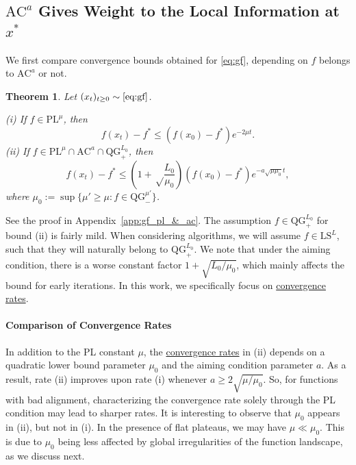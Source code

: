 \documentclass{article}
\def\xcont{(x_t)_{t\ge 0}}
\def\pl{{\text{PL}^\mu}}
\newcommand{\bpar}[1]{\left(#1\right)}
\newcommand{\ls}{\text{LS}^{L}}
\newcommand{\ac}{\text{AC}^{a}}
\newcommand{\qg}{\text{QG}_{+}^{L_0}}
\newcommand{\qginff}[1]{\text{QG}_{-}^{#1}}
\theoremstyle{plain}
\newtheorem{theorem}{Theorem}[section]
\theoremstyle{definition}
\theoremstyle{remark}
\begin{document}
\subsection{$\ac$ Gives Weight to the Local Information at $x^\ast$}\label{sec:local_weight}
We first compare convergence bounds obtained for \eqref{eq:gf}, depending on $f$ belongs to $\ac$ or not.
\begin{theorem}\label{thm:gf_pl_&_ac}
    Let $\xcont \sim \eqref{eq:gf}$. 

    \noindent
    (i) \cite[Theorem 3]{polyak2017lyapunov}  If $f \in \pl$,  then
    $$ f(x_t)-f^\ast \le (f(x_0)-f^\ast)e^{-2 \mu t}. $$
    (ii) If $f \in \pl \cap \ac \cap \qg$, then
    $$ f(x_t)-f^\ast \le \bpar{1+\sqrt\frac{L_0}{\mu_0}}(f(x_0)-f^\ast)e^{-a\sqrt{\mu \mu_0}t}, $$
    where $\mu_0 := \sup\{\mu' \ge\mu : f \in \qginff{\mu'}\} $.
\end{theorem}
See the proof in Appendix~\ref{app:gf_pl_&_ac}. The assumption $f \in  \qg$ for bound (ii) is fairly mild. When considering algorithms, we will assume $f \in \ls$, such that they will naturally belong to $\qg$. We note that under the aiming condition, there is a worse constant factor $1+\sqrt{L_0/\mu_0}$, which mainly affects the bound for early iterations. In this work, we specifically focus on \hyperlink{cr}{convergence rates}.

\paragraph{Comparison of Convergence Rates} In addition to the PL constant $\mu$, the \hyperlink{cr}{convergence rates} in (ii) depends on a quadratic lower bound parameter $\mu_0$ and the aiming condition parameter $a$. As a result, rate (ii) improves upon rate (i) whenever $a \ge 2\sqrt{\mu/\mu_0}$. So, for functions with bad alignment, characterizing the convergence rate solely through the PL condition may lead to sharper rates. It is interesting to observe that $\mu_0$ appears in (ii), but not in (i). In the presence of flat plateaus, we may have $\mu \ll \mu_0$. This is due to $\mu_0$ being less affected by global irregularities of the function landscape, as we discuss next.
\end{document}
